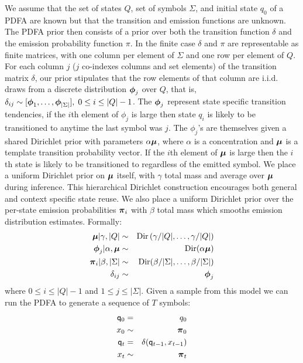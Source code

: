 We assume that the set of states $Q$, set of symbols $\Sigma$, and initial state $q_0$ of a PDFA are known but that the transition and emission functions are unknown.  The PDFA prior then consists of a prior over both the transition function $\delta$ and the emission probability function $\pi$.  In the finite case $\delta$ and $\pi$ are representable as finite matrices, with one column per element of $\Sigma$ and one row per element of $Q$.  For each column $j$ ($j$ co-indexes columns and set elements) of the transition matrix $\delta$, our prior stipulates that the row elements of that column are  i.i.d. draws from a discrete distribution $\bphi_j$ over $Q$, that is, $\delta_{ij} \sim [\bphi_1,\ldots,\bphi_{|\Sigma|}], \; 0 \leq i\leq|Q|-1$.  The $\bphi_j$ represent state specific transition tendencies, if the $i$th element of $\phi_{j}$ is large then state $q_i$ is likely to be transitioned to anytime the last symbol was $j.$   The $\phi_{j}$'s are   themselves given a shared Dirichlet prior with parameters $\alpha\bmu$, where $\alpha$ is a concentration and $\bmu$ is a template transition probability vector.   If the $i$th element of $\bmu$ is large then the $i$th state is likely to be transitioned to regardless of the emitted symbol.  We place a uniform Dirichlet prior on $\bmu$ itself, with $\gamma$ total mass and average over $\bmu$ during inference.  This hierarchical Dirichlet construction encourages both general and context specific state reuse.
 We also place a uniform Dirichlet prior over the per-state emission probabilities $\bpi_i$ with $\beta$ total mass which smooths emission distribution estimates.  Formally:
%
\begin{eqnarray}
\bmu|\gamma,|Q| & \sim & \mathrm{Dir}\left(\gamma/|Q|,\ldots,\gamma/|Q|\right) \label{gen:mu} \nonumber \\
\bphi_{j}|\alpha,\bmu  & \sim & \mathrm{Dir}(\alpha\bmu) \label{gen:phi} \nonumber \\
\bpi_{i}|\beta,|\Sigma| & \sim & \mathrm{Dir}(\beta/|\Sigma|,\ldots,\beta/|\Sigma|) \label{gen:pi} \nonumber \\
\delta_{ij} & \sim & \bphi_{j} \label{gen:delta} \nonumber
\end{eqnarray}
%
where $0 \leq i \leq |Q|-1$ and $1 \leq j \leq |\Sigma|$.  Given a sample from this model we can run the PDFA to generate a sequence of $T$ symbols:
%
\begin{eqnarray}
\q_0 & = & q_0 \label{gen:q0} \nonumber \\
x_0 & \sim & \bpi_0 \label{gen:x0} \nonumber \\
\q_t & = & \delta(\q_{t-1},x_{t-1}) \label{gen:q} \nonumber \\
x_t & \sim & \bpi_t \label{gen:x} \nonumber
\end{eqnarray}
